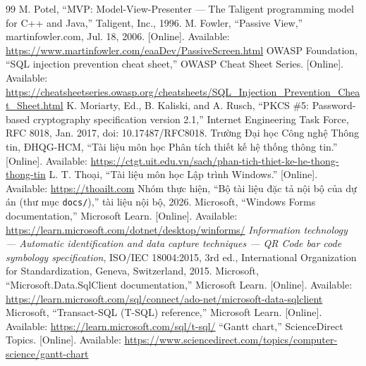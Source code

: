 \documentclass[14pt]{report}
\begin{document}


\renewcommand{\bibname}{TÀI LIỆU THAM KHẢO}
\clearpage{}
{}
\begin{thebibliography}{99}
   M. Potel, ``MVP: Model-View-Presenter --- The Taligent programming model for C++ and Java,'' Taligent, Inc., 1996.
   M. Fowler, ``Passive View,'' martinfowler.com, Jul. 18, 2006. [Online]. Available: \url{https://www.martinfowler.com/eaaDev/PassiveScreen.html}
   OWASP Foundation, ``SQL injection prevention cheat sheet,'' OWASP Cheat Sheet Series. [Online]. Available: \url{https://cheatsheetseries.owasp.org/cheatsheets/SQL_Injection_Prevention_Cheat_Sheet.html}
   K. Moriarty, Ed., B. Kaliski, and A. Rusch, ``PKCS \#5: Password-based cryptography specification version 2.1,'' Internet Engineering Task Force, RFC 8018, Jan. 2017, doi: 10.17487/RFC8018.
   Trường Đại học Công nghệ Thông tin, ĐHQG-HCM, ``Tài liệu môn học Phân tích thiết kế hệ thống thông tin.'' [Online]. Available: \url{https://ctgt.uit.edu.vn/sach/phan-tich-thiet-ke-he-thong-thong-tin}
   L. T. Thoại, ``Tài liệu môn học Lập trình Windows.'' [Online]. Available: \url{https://thoailt.com}
   Nhóm thực hiện, ``Bộ tài liệu đặc tả nội bộ của dự án (thư mục \texttt{docs/}),'' tài liệu nội bộ, 2026.
   Microsoft, ``Windows Forms documentation,'' Microsoft Learn. [Online]. Available: \url{https://learn.microsoft.com/dotnet/desktop/winforms/}
   \emph{Information technology --- Automatic identification and data capture techniques --- QR Code bar code symbology specification}, ISO/IEC 18004:2015, 3rd ed., International Organization for Standardization, Geneva, Switzerland, 2015.
   Microsoft, ``Microsoft.Data.SqlClient documentation,'' Microsoft Learn. [Online]. Available: \url{https://learn.microsoft.com/sql/connect/ado-net/microsoft-data-sqlclient}
   Microsoft, ``Transact-SQL (T-SQL) reference,'' Microsoft Learn. [Online]. Available: \url{https://learn.microsoft.com/sql/t-sql/}
   ``Gantt chart,'' ScienceDirect Topics. [Online]. Available: \url{https://www.sciencedirect.com/topics/computer-science/gantt-chart}

\end{thebibliography}
\end{document}
